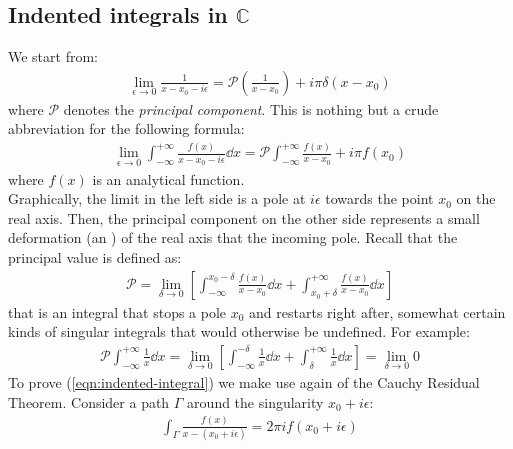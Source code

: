 \documentclass[../template.tex]{subfiles}
\begin{document}
\subsection{Indented integrals in $\mathbb{C}$}
We start from:
\begin{align}
    \lim_{\epsilon \to 0} \frac{1}{x - x_0 - i \epsilon} = \mathcal{P}\left(\frac{1}{x - x_0} \right)  + i \pi \delta (x- x_0)
\end{align}
where $\mathcal{P}$ denotes the \textit{principal component}. This is nothing but a crude abbreviation for the following formula:
\begin{align}
    \lim_{\epsilon \to 0} \int_{-\infty}^{+\infty}  \frac{f(x)}{x- x_0 -i \epsilon}\dd{x} = \mathcal{P}\int_{-\infty}^{+\infty} \frac{f(x)}{x - x_0 } + i \pi f(x_0)  
    \label{eqn:indented-integral}
\end{align}  
where $f(x)$ is an analytical function.\\
Graphically, the limit in the left side is  a pole at $i \epsilon$ towards the point $x_0$ on the real axis. Then, the principal component on the other side represents a small deformation (an ) of the real axis that  the incoming pole. Recall that the principal value is defined as:
\begin{align*}
    \mathcal{P} = \lim_{\delta \to 0} \left[\int_{-\infty}^{x_0 - \delta} \frac{f(x)}{x- x_0 }\dd{x} + \int_{x_0 + \delta}^{+\infty} \frac{f(x)}{x-x_0} \dd{x}  \right]
\end{align*}
that is an integral that stops  a pole $x_0$ and restarts right after, somewhat  certain kinds of singular integrals that would otherwise be undefined. For example:
\begin{align*}
    \mathcal{P}\int_{-\infty}^{+\infty}\frac{1}{x} \dd{x} = \lim_{\delta \to 0} \left[ \int_{-\infty}^{-\delta} \frac{1}{x} \dd{x} + \int_{\delta}^{+\infty} \frac{1}{x} \dd{x}  \right] = \lim_{\delta \to 0} 0
\end{align*} 
To prove (\ref{eqn:indented-integral}) we make use again of the Cauchy Residual Theorem. Consider a path $\Gamma$ around the singularity $x_0 + i \epsilon$:
\begin{align*}
    \int_\Gamma \frac{f(x)}{x - (x_0 + i \epsilon)} = 2 \pi i f(x_0 + i \epsilon) 
\end{align*}  
\end{document}
